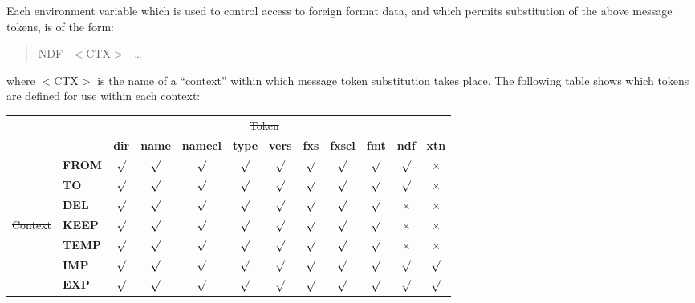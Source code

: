 Each environment variable which is used to control access to foreign
format data, and which permits substitution of the above message
tokens, is of the form:

\begin{quote}
NDF\_$<$CTX$>$\_\ldots
\end{quote}

where $<$CTX$>$ is the name of a ``context'' within which message
token substitution takes place. The following table shows which tokens
are defined for use within each context:

\newcommand{\yes}[0]{$\surd$}
\newcommand{\no}[0]{$\times$}
\begin{center}
\begin{tabular}{r|l|cccccccccc|}
\multicolumn{2}{c}{}&\multicolumn{9}{c}{\st{Token}}\\
\cline{3-12}
\multicolumn{2}{c|}{}&{\bf dir}&{\bf name}&{\bf namecl}&{\bf type}&{\bf vers}
&{\bf fxs}&{\bf fxscl}&{\bf fmt}&{\bf ndf}&{\bf xtn}\\
\cline{2-12}
&{\bf FROM} & \yes & \yes & \yes & \yes & \yes & \yes & \yes & \yes & \yes & \no \\
&{\bf TO}   & \yes & \yes & \yes & \yes & \yes & \yes & \yes & \yes & \yes & \no \\
&{\bf DEL}  & \yes & \yes & \yes & \yes & \yes & \yes & \yes & \yes & \no  & \no \\
\st{Context} &{\bf KEEP} & \yes & \yes & \yes & \yes & \yes & \yes & \yes & \yes & \no  & \no \\
&{\bf TEMP} & \yes & \yes & \yes & \yes & \yes & \yes & \yes & \yes & \no & \no \\
&{\bf IMP}  & \yes & \yes & \yes & \yes & \yes & \yes & \yes & \yes & \yes & \yes \\
&{\bf EXP}  & \yes & \yes & \yes & \yes & \yes & \yes & \yes & \yes & \yes & \yes \\
\cline{2-12}
\end{tabular}
\end{center}


